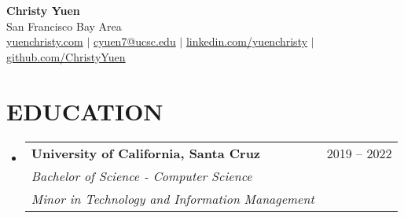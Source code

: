 \documentclass[a4paper,11pt]{article}
\makeatletter
\newcommand{\seticon}[1]{\textcolor{Cerulean}{\csname #1\endcsname}}
\newcommand{\resumeSubheading}[4]{
  \vspace{-2pt}\item
    \begin{tabular*}{0.97\textwidth}[t]{l@{\extracolsep{\fill}}r}
      \textbf{#1} & #2 \\
      \textit{\small#3} & \textnormal{\small #4} \\
    \end{tabular*}\vspace{-8pt}
}
\newcommand{\resumeSub}[6]{ %
  \vspace{-2pt}\item
    \begin{tabular*}{0.97\textwidth}[t]{l@{\extracolsep{\fill}}r}
      \textbf{#1} & #2 \\
      \textit{\small#3} & \textnormal{\small #4} \\
      \textit{\small#5} & \textnormal{\small #6} \\
    \end{tabular*} \vspace{-8pt}
}
\newcommand{\resumeSubHeadingListStart}{\begin{itemize}[leftmargin=0.15in, label={}]}
\newcommand{\resumeSubHeadingListEnd}{\end{itemize}}
\makeatother
\begin{document}
\iffalse
\begin{wrapfigure}{R}{0.15\textwidth}
\vspace{-25pt}
\texttt{[image: dp\_cropped]}
\end{wrapfigure}
\fi

\begin{center}
    \textbf{\Huge Christy Yuen} \\
    \normalfont San Francisco Bay Area \vspace{1pt} \\
    \small {\ul{yuenchristy.com}} $|$ 
    {\ul{cyuen7@ucsc.edu}} $|$ 
    		\href{https://www.linkedin.com/in/yuenchristy/}{\ul{linkedin.com/yuenchristy}} $|$ 
    		\href{https://github.com/ChristyYuen}{\ul{github.com/ChristyYuen}}
\end{center}
\vspace{-12pt} %
\section{ \textbf{EDUCATION}}
  \resumeSubHeadingListStart
    \resumeSub
      {University of California, Santa Cruz}{2019 -- 2022}
      {Bachelor of Science - Computer Science}{}
      {Minor in Technology and Information Management}{}   
  \resumeSubHeadingListEnd
\end{document}
